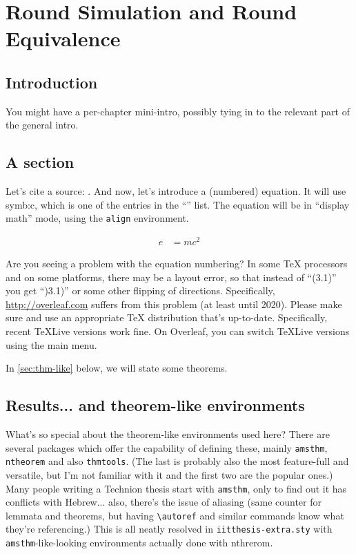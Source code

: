 \chapter{Round Simulation and Round Equivalence}
\label{chap:round_equivalence}

\section{Introduction}

You might have a per-chapter mini-intro, possibly tying in to the relevant part of the general intro.

\section{A section}

\lipsum[1]

Let's cite a source: \cite{Yao1977}. And now,  let's introduce a (numbered) equation. It will use \gls{symb:c}, which is one of the entries in the ``'' list. The equation will be in ``display math'' mode, using the \texttt{align} environment.

\begin{align}
\label{eq:emc2}
e &= mc^2
\end{align}
\begin{notes}
\item	Are you seeing a problem with the equation numbering? In some TeX processors and on some platforms, there may be a layout error, so that instead of ``(3.1)'' you get ``)3.1)'' or some other flipping of directions. Specifically, \url{http://overleaf.com} suffers from this problem (at least until 2020). Please make sure and use an appropriate TeX distribution that's up-to-date. Specifically, recent TeXLive versions work fine. On Overleaf, you can switch TeXLive versions using the main menu.
\end{notes}

In \autoref{sec:thm-like} below, we will state some theorems.

\section{Results... and theorem-like environments}
\label{sec:thm-like}

What's so special about the theorem-like environments used here? There are several packages which offer the capability of defining these, mainly \texttt{amsthm}, \texttt{ntheorem} and also \texttt{thmtools}. (The last is probably also the most feature-full and versatile, but I'm not familiar with it and the first two are the popular ones.) Many people writing a Technion thesis start with \texttt{amsthm}, only to find out it has conflicts with Hebrew... also, there's the issue of aliasing (same counter for lemmata and theorems, but having \texttt{{\textbackslash}autoref} and similar commands know what they're referencing.) This is all neatly resolved in \texttt{iitthesis-extra.sty} with \texttt{amsthm}-like-looking environments actually done with nthrerom.

